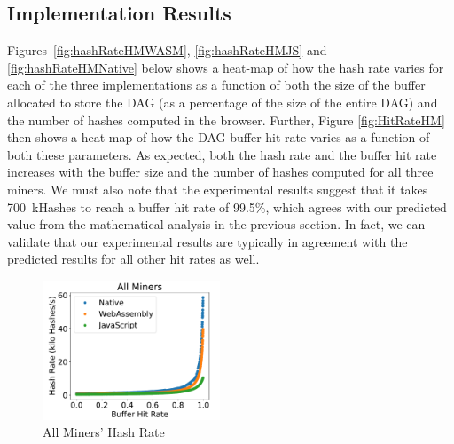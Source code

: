 \documentclass[runningheads]{llncs}
\begin{document}
\subsection{Implementation Results}
Figures~\ref{fig:hashRateHMWASM}, \ref{fig:hashRateHMJS} and \ref{fig:hashRateHMNative} below shows a heat-map of how the hash rate varies for each of the three implementations as a function of both the size of the buffer allocated to store the DAG (as a percentage of the size of the entire DAG) and the number of hashes computed in the browser. Further, Figure \ref{fig:HitRateHM} then shows a heat-map of how the DAG buffer hit-rate varies as a function of both these parameters. 
As expected, both the hash rate and the buffer hit rate increases with the buffer size and the number of hashes computed for all three miners. We must also note that the experimental results suggest that it takes 700~kHashes to reach a buffer hit rate of 99.5\%, which agrees with our predicted value from the mathematical analysis in the previous section. In fact, we can validate that our experimental results are typically in agreement with the predicted results for all other hit rates as well.

\begin{figure}[h]
\centering
\includegraphics[width=200px,keepaspectratio]{All_Miners_Hash_Rate.pdf}
\caption{All Miners' Hash Rate}
\label{fig:HashRateTraj} 
\end{figure}
\end{document}
